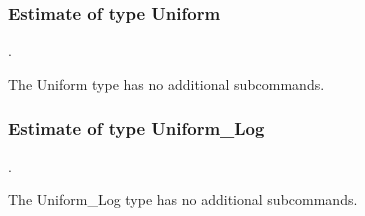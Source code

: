 \subsubsection{Estimate of type Uniform}
.
\label{syntax:Estimate-Uniform}

The Uniform type has no additional subcommands.
\subsubsection{Estimate of type Uniform\_Log}
.
\label{syntax:Estimate-UniformLog}

The Uniform\_Log type has no additional subcommands.
